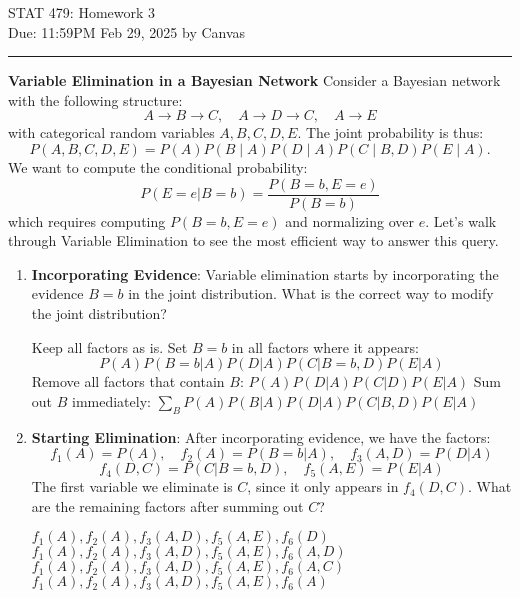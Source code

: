 \documentclass[12pt,letterpaper, onecolumn]{exam}
\begin{document}
\begingroup  
    \centering
    \LARGE STAT 479: Homework 3\\[0.5em]
    \large Due: 11:59PM Feb 29, 2025 by Canvas\\[0.5em]
\endgroup
\rule{\textwidth}{0.4pt}
\pointsdroppedatright   %
\printanswers
\renewcommand{\solutiontitle}{\noindent\textbf{Answer:}\enspace}

\vspace{-20pt}
\begin{questions}
\vspace{-10pt}



\question[20 points]\textbf{Variable Elimination in a Bayesian Network}\droppoints
Consider a Bayesian network with the following structure:  
\[
A \to B \to C, \quad A \to D \to C, \quad A \to E
\]
with categorical random variables $A,B,C,D,E$. The joint probability is thus:
\[
P(A,B,C,D,E) = P(A)P(B\mid A)P(D\mid A)P(C \mid B,D)P(E\mid A).
\]
We want to compute the conditional probability:  
\[
P(E = e | B = b) = \frac{P(B = b, E = e)}{P(B = b)}
\]
which requires computing \( P(B = b, E = e) \) and normalizing over \( e \). Let's walk through Variable Elimination to see the most efficient way to answer this query.

\begin{enumerate}[label=(\alph*)]
    \item \textbf{Incorporating Evidence}: Variable elimination starts by incorporating the evidence \( B = b \) in the joint distribution. What is the correct way to modify the joint distribution?
    \begin{choices}
        \choice Keep all factors as is.
        \choice Set \( B = b \) in all factors where it appears: $$
        P(A) P(B = b | A) P(D | A) P(C | B = b, D) P(E | A)$$
        \choice Remove all factors that contain \( B \):  
        $
        P(A) P(D | A) P(C | D) P(E | A)
        $
        \choice Sum out \( B \) immediately:  
        $
        \sum_B P(A) P(B | A) P(D | A) P(C | B, D) P(E | A)
        $
    \end{choices}

    \item \textbf{Starting Elimination}: After incorporating evidence, we have the factors:
    \[
    f_1(A) = P(A), \quad f_2(A) = P(B = b | A), \quad f_3(A, D) = P(D | A)
    \]
    \[
    f_4(D, C) = P(C | B = b, D), \quad f_5(A, E) = P(E | A)
    \]
    The first variable we eliminate is \( C \), since it only appears in \( f_4(D, C) \). What are the remaining factors after summing out $C$?
    \begin{choices}
        \choice \(f_1(A), f_2(A), f_3(A,D), f_5(A,E), f_6(D) \)
        \choice \(f_1(A), f_2(A), f_3(A,D), f_5(A,E), f_6(A, D) \)
        \choice \(f_1(A), f_2(A), f_3(A,D), f_5(A,E), f_6(A, C) \)
        \choice \(f_1(A), f_2(A), f_3(A,D), f_5(A,E), f_6(A) \)
    \end{choices}


\end{enumerate}
\end{questions}
\end{document}
